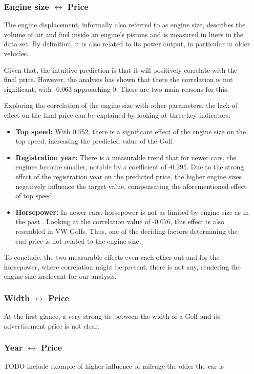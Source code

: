 \subsubsection{Engine size $\leftrightarrow$ Price}
The engine displacement, informally also referred to as engine size, describes the volume of air and fuel inside an engine's pistons \autocite{EngineDisplacement2024}
and is measured in liters in the data set.
By definition, it is also related to its power output, in particular in older vehicles.
\par
Given that, the intuitive prediction is that it will positively correlate with the final price. 
However, the analysis has shown that there the correlation is not significant, with -0.063 approaching 0.
There are two main reasons for this. 
\par
Exploring the correlation of the engine size with other parameters, the lack of effect on the final price can be explained by looking at
three key indicators:
\begin{itemize}
    \item \textbf{Top speed: }
    With 0.552, there is a significant effect of the engine size on the top speed, increasing the predicted value of the Golf.
    \item \textbf{Registration year: }
    There is a measurable trend that for newer cars, the engines become smaller, notable by a coefficient of -0.295.
    Due to the strong effect of the registration year on the predicted price, the higher engine sizes negatively influence the target value,
    compensating the aforementioned effect of top speed.
    \item \textbf{Horsepower: }
    In newer cars, horsepower is not as limited by engine size as in the past \autocite{WhatEngineDisplacement}. 
    Looking at the correlation value of -0.076, this effect is also resembled in VW Golfs. Thus, one of the deciding factors determining the end price
    is not related to the engine size.
\end{itemize}
To conclude, the two measurable effects even each other out and for the horsepower, where correlation might be present, there is not any, rendering the 
engine size irrelevant for our analysis. %
\subsubsection{Width $\leftrightarrow$ Price}
At the first glance, a very strong tie between the width of a Golf and its advertisement price is not clear.
\subsubsection{Year $\leftrightarrow$ Price} \label{year_to_price_correlation}
TODO include example of higher influence of mileage the older the car is
